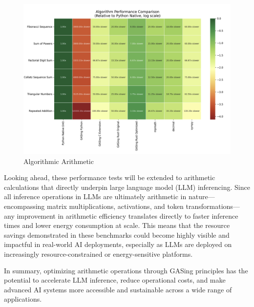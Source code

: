 \begin{figure}[H]
  \centering
  \includegraphics[width=\linewidth]{images/AlgorithmPerformanceComparison.png}
  \caption{Algorithmic Arithmetic}
  \label{fig:algorithmperformancecomparison}
\end{figure}



Looking ahead, these performance tests will be extended to arithmetic calculations that directly underpin large language model (LLM) inferencing. Since all inference operations in LLMs are ultimately arithmetic in nature—encompassing matrix multiplications, activations, and token transformations—any improvement in arithmetic efficiency translates directly to faster inference times and lower energy consumption at scale. This means that the resource savings demonstrated in these benchmarks could become highly visible and impactful in real-world AI deployments, especially as LLMs are deployed on increasingly resource-constrained or energy-sensitive platforms.

In summary, optimizing arithmetic operations through GASing principles has the potential to accelerate LLM inference, reduce operational costs, and make advanced AI systems more accessible and sustainable across a wide range of applications.